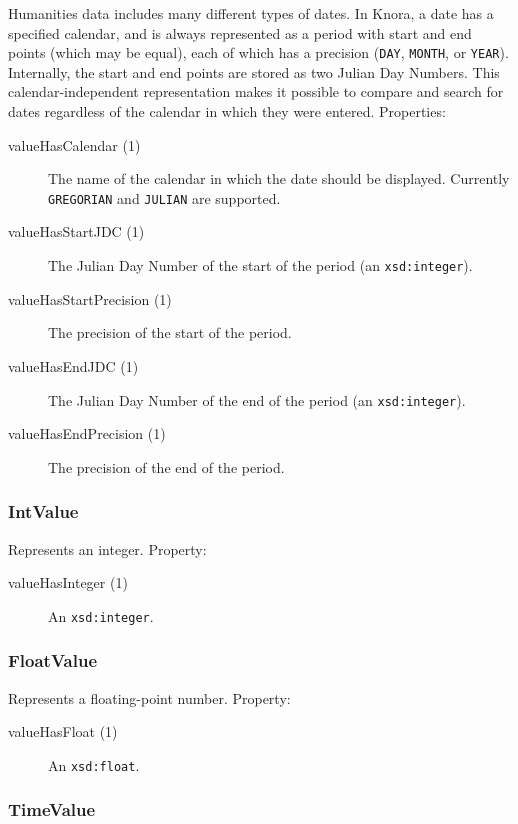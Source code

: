 \documentclass[12pt, a4paper]{article}
\begin{document}
Humanities data includes many different types of dates. In Knora, a date has a specified calendar, and is always represented as a period with start and end points (which may be equal), each of which has a precision (\texttt{DAY}, \texttt{MONTH}, or \texttt{YEAR}). Internally, the start and end points are stored as two Julian Day Numbers. This calendar-independent representation makes it possible to compare and search for dates regardless of the calendar in which they were entered. Properties:

\begin{description}
	\item[valueHasCalendar (1)] The name of the calendar in which the date should be displayed. Currently \texttt{GREGORIAN} and \texttt{JULIAN} are supported.
	\item[valueHasStartJDC (1)] The Julian Day Number of the start of the period (an \texttt{xsd:integer}).
	\item[valueHasStartPrecision (1)] The precision of the start of the period.
	\item[valueHasEndJDC (1)] The Julian Day Number of the end of the period (an \texttt{xsd:integer}).
	\item[valueHasEndPrecision (1)] The precision of the end of the period.
\end{description}

\subsubsection{IntValue}

Represents an integer. Property:

\begin{description}
	\item[valueHasInteger (1)] An \texttt{xsd:integer}.
\end{description}

\subsubsection{FloatValue}

Represents a floating-point number. Property:

\begin{description}
	\item[valueHasFloat (1)] An \texttt{xsd:float}.
\end{description}

\subsubsection{TimeValue}
\end{document}
